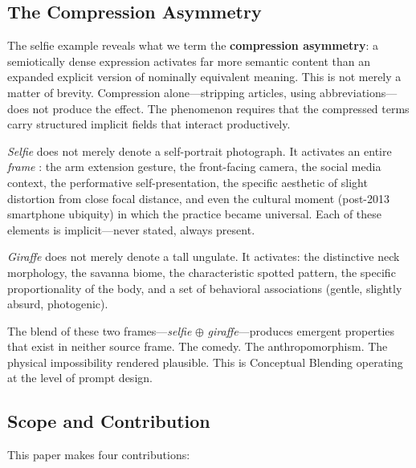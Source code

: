 \documentclass[12pt,a4paper]{article}
\begin{document}
\subsection{The Compression Asymmetry}

The selfie example reveals what we term the \textbf{compression asymmetry}: a semiotically dense expression activates far more semantic content than an expanded explicit version of nominally equivalent meaning.
This is not merely a matter of brevity.
Compression alone---stripping articles, using abbreviations---does not produce the effect.
The phenomenon requires that the compressed terms carry structured implicit fields that interact productively.

\textit{Selfie} does not merely denote a self-portrait photograph.
It activates an entire \textit{frame} \cite{fillmore1982}: the arm extension gesture, the front-facing camera, the social media context, the performative self-presentation, the specific aesthetic of slight distortion from close focal distance, and even the cultural moment (post-2013 smartphone ubiquity) in which the practice became universal.
Each of these elements is implicit---never stated, always present.

\textit{Giraffe} does not merely denote a tall ungulate.
It activates: the distinctive neck morphology, the savanna biome, the characteristic spotted pattern, the specific proportionality of the body, and a set of behavioral associations (gentle, slightly absurd, photogenic).

The blend of these two frames---\textit{selfie} $\oplus$ \textit{giraffe}---produces emergent properties that exist in neither source frame.
The comedy.
The anthropomorphism.
The physical impossibility rendered plausible.
This is Conceptual Blending \cite{fauconnier2002} operating at the level of prompt design.

\subsection{Scope and Contribution}

This paper makes four contributions:
\end{document}
